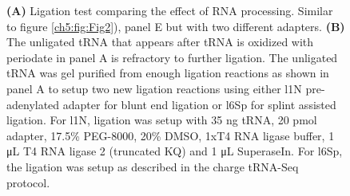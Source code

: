 \begin{figure}[ht]
    \centering
    \caption[Ligation tests, related to panel E.]{
    \textbf{(A)} Ligation test comparing the effect of RNA processing.
    Similar to figure \ref{ch5:fig:Fig2}), panel E but with two different adapters.
    \textbf{(B)} The unligated tRNA that appears after tRNA is oxidized with periodate in panel A is refractory to further ligation.
    The unligated tRNA was gel purified from enough ligation reactions as shown in panel A to setup two new ligation reactions using either l1N pre-adenylated adapter for blunt end ligation or l6Sp for splint assisted ligation.
    For l1N, ligation was setup with 35 ng tRNA, 20 pmol adapter, 17.5\% PEG-8000, 20\% DMSO, 1xT4 RNA ligase buffer, 1 μL T4 RNA ligase 2 (truncated KQ) and 1 μL SuperaseIn.
    For l6Sp, the ligation was setup as described in the charge tRNA-Seq protocol.
    }
    \label{ch5:figsupp:f2S5}
\end{figure}


